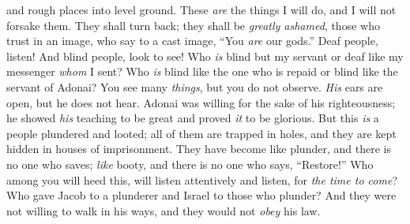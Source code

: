 \begin{biblechapter}
and rough places into level ground. 
These \textit{are} the things I will do, 
and I will not forsake them.
\verse They shall turn back; 
they shall be \textit{greatly ashamed}, 
those who trust in an image, 
who say to a cast image, “You \textit{are} our gods.”
 Deaf people, listen! 
And blind people, look to see!
\verse Who \textit{is} blind but my servant 
or deaf like my messenger \textit{whom} I sent? 
Who \textit{is} blind like the one who is repaid 
or blind like the servant of Adonai?
\verse You see many \textit{things}, but you do not observe. 
\textit{His} ears are open, but he does not hear.
\verse Adonai was willing for the sake of his righteousness; 
he showed \textit{his} teaching to be great and proved \textit{it} to be glorious.
\verse But this \textit{is} a people plundered and looted; all of them are trapped in holes, 
and they are kept hidden in houses of imprisonment. 
They have become like plunder, and there is no one who saves; 
\textit{like} booty, and there is no one who says, “Restore!”
\verse Who among you will heed this, 
will listen attentively and listen, for \textit{the time to come}?
\verse Who gave Jacob to a plunderer 
and Israel to those who plunder?
\verse And they were not willing to walk in his ways, 
and they would not \textit{obey} his law.
\end{biblechapter}


